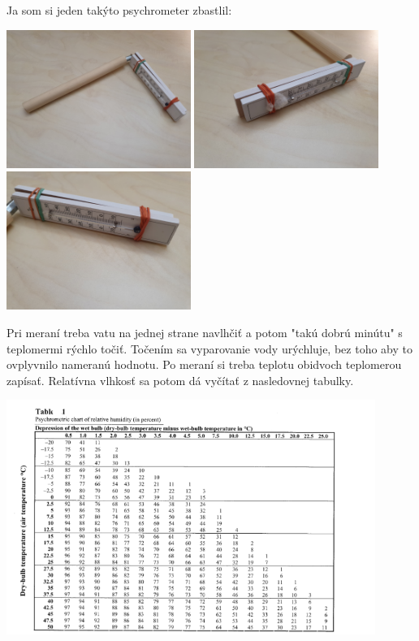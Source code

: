 \documentclass[11pt]{extarticle}
\begin{document}
Ja som si jeden takýto psychrometer zbastlil:\\
\begin{center}
	\includegraphics[height=4.5cm]{moj-sling-psychrometer-1}
	\includegraphics[height=4.5cm]{moj-sling-psychrometer-2}
	\includegraphics[height=4.5cm]{moj-sling-psychrometer-3}
\end{center}
Pri meraní treba vatu na jednej strane navlhčiť a potom "takú dobrú minútu" s teplomermi rýchlo točiť.
Točením sa vyparovanie vody urýchluje, bez toho aby to ovplyvnilo nameranú hodnotu.
Po meraní si treba teplotu obidvoch teplomerou zapísať.
Relatívna vlhkosť sa potom dá vyčítať z nasledovnej tabulky.
\begin{center}
\includegraphics[width=0.9\textwidth]{relative-humidity-table}
\end{center}
\end{document}
